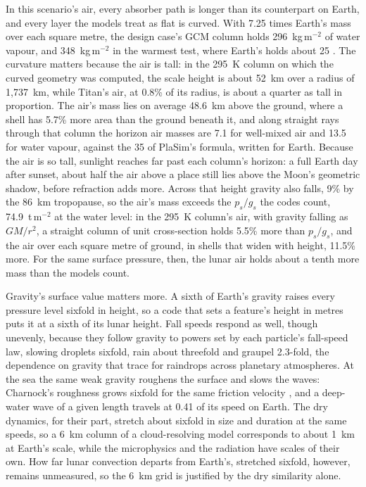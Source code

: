In this scenario's air, every absorber path is longer than its counterpart on Earth, and every layer the models
treat as flat is curved. With 7.25 times Earth's mass over each square metre, the design case's GCM column holds
296~kg\,m$^{-2}$ of water vapour, and 348~kg\,m$^{-2}$ in the warmest test, where Earth's holds about 25
\autocite{trenberth2005trends}. The curvature matters because the air is tall: in the 295~K column on
which the curved geometry was computed, the scale height is about 52~km over a radius of 1,737~km, while Titan's air, at
0.8\% of its radius, is about a quarter as tall in proportion. The air's mass lies on average 48.6~km above the
ground, where a shell has 5.7\% more area than the ground beneath it, and along straight rays through that column the horizon air masses are 7.1 for well-mixed air and 13.5 for water vapour, against the 35 of PlaSim's formula,
written for Earth. Because the air is so tall, sunlight reaches far past each column's
horizon: a full Earth day after sunset, about half the air above a place still lies above the Moon's geometric
shadow, before refraction adds more. Across that height gravity also falls, 9\% by the 86~km
tropopause, so the air's mass exceeds the $p_s/g_s$ the codes count, 74.9~t\,m$^{-2}$ at the water level: in the
295~K column's air, with gravity falling as $GM/r^2$, a straight column of unit cross-section holds 5.5\% more than
$p_s/g_s$, and the air over each square metre of ground, in shells that widen with height, 11.5\% more. For the
same surface pressure, then, the lunar air holds about a tenth more mass than the models count.

Gravity's surface value matters more. A sixth of Earth's gravity raises every pressure level sixfold in height,
so a code that sets a feature's height in metres puts it at a sixth of its lunar height. Fall speeds respond as
well, though unevenly, because they follow gravity to powers set by each particle's fall-speed law, slowing
droplets sixfold, rain about threefold and graupel 2.3-fold, the dependence on gravity that
\textcite{loftus2021physics} trace for raindrops across planetary atmospheres. At the sea the same weak gravity
roughens the surface and slows the waves: Charnock's roughness grows sixfold for the same friction velocity
\autocite{charnock1955wind}, and a deep-water wave of a given length travels at 0.41 of its speed on
Earth. The dry dynamics, for their part, stretch about sixfold in size and duration at the same speeds,
so a 6~km column of a cloud-resolving model corresponds to about 1~km at Earth's scale, while the microphysics and the radiation have scales of their own. How far lunar convection departs from Earth's, stretched sixfold, however, remains
unmeasured, so the 6~km grid is justified by the dry similarity alone.

